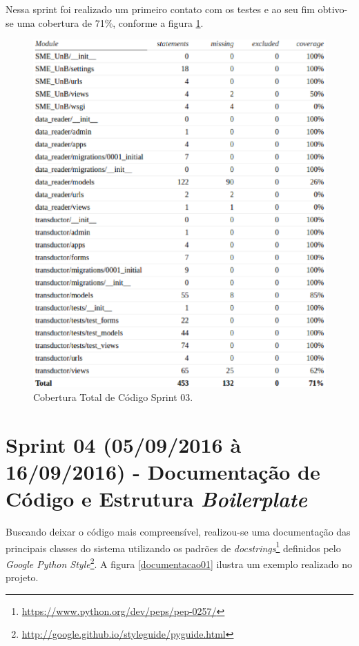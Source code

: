\vfill
\pagebreak

Nessa sprint foi realizado um primeiro contato com os testes e ao seu fim obtivo-se uma cobertura de 71\%, conforme a figura \ref{cobertura01}.

\begin{figure}[!htpb]
    \centering
    \includegraphics[keepaspectratio=true,scale=0.5]{figuras/cobertura01.eps}
    \caption{Cobertura Total de Código Sprint 03. }
    \label{cobertura01}
\end{figure}

\section{Sprint 04 (05/09/2016 à 16/09/2016) - Documentação de Código e Estrutura \textit{Boilerplate}}
Buscando deixar o código mais compreensível, realizou-se uma documentação das principais classes do sistema utilizando os padrões de \textit{docstrings}\footnote{\url{https://www.python.org/dev/peps/pep-0257/}} definidos pelo \textit{Google Python Style}\footnote{\url{http://google.github.io/styleguide/pyguide.html}}. A figura \ref{documentacao01} ilustra um exemplo realizado no projeto.

